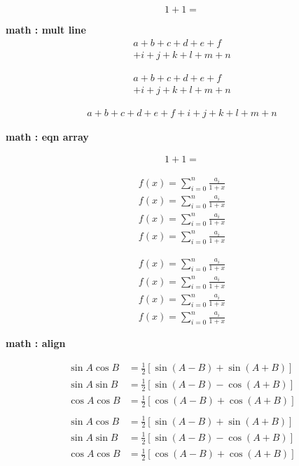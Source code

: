 \documentclass[12pt,a4paper,oneside]{book}
\begin{document}
		\begin{equation}
		1+1=
		\end{equation}
	
		\textbf{math : mult line}
		\begin{multline}
		a+b+c+d+e+f\\
		+i+j+k+l+m+n
		\end{multline}

		\begin{multline*}
		a+b+c+d+e+f\\
		+i+j+k+l+m+n
		\end{multline*}

		\begin{multline*}
		a+b+c+d+e+f+i+j+k+l+m+n
		\end{multline*}
		
		
		\newpage
		\textbf{math : eqn array}

		\begin{eqnarray}
		1+1=
		\end{eqnarray}
		
 
		\begin{eqnarray*}
			f(x) = \sum_{i=0}^{n} \frac{a_i}{1+x} \\
			\textstyle f(x) = \textstyle \sum_{i=0}^{n} \frac{a_i}{1+x} \\
			\scriptstyle f(x) = \scriptstyle \sum_{i=0}^{n} \frac{a_i}{1+x} \\
			\scriptscriptstyle f(x) = \scriptscriptstyle \sum_{i=0}^{n} \frac{a_i}{1+x}
		\end{eqnarray*}
		
		\begin{eqnarray}
			f(x) = \sum_{i=0}^{n} \frac{a_i}{1+x} \\
			\textstyle f(x) = \textstyle \sum_{i=0}^{n} \frac{a_i}{1+x} \\
			\scriptstyle f(x) = \scriptstyle \sum_{i=0}^{n} \frac{a_i}{1+x} \\
			\scriptscriptstyle f(x) = \scriptscriptstyle \sum_{i=0}^{n} \frac{a_i}{1+x}
		\end{eqnarray}
		
		
		\newpage
		\textbf{math : align}

		\begin{align*}
		\sin A \cos B &= \frac{1}{2}\left[ \sin(A-B)+\sin(A+B) \right] \\
		\sin A \sin B &= \frac{1}{2}\left[ \sin(A-B)-\cos(A+B) \right] \\
		\cos A \cos B &= \frac{1}{2}\left[ \cos(A-B)+\cos(A+B) \right] \\
		\end{align*}
		\begin{align}
		\sin A \cos B &= \frac{1}{2}\left[ \sin(A-B)+\sin(A+B) \right] \\
		\sin A \sin B &= \frac{1}{2}\left[ \sin(A-B)-\cos(A+B) \right] \\
		\cos A \cos B &= \frac{1}{2}\left[ \cos(A-B)+\cos(A+B) \right]
		\end{align}
\end{document}
